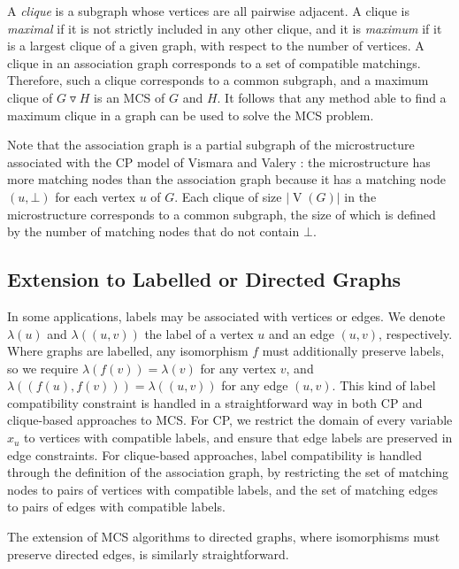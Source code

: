 \documentclass{llncs}
\newcommand{\modularproduct}{\operatorname{\triangledown}}
\begin{document}
A \emph{clique} is a subgraph whose vertices are all pairwise adjacent. A clique is \emph{maximal}
if it is not strictly included in any other clique, and it is \emph{maximum} if it is a largest
clique of a given graph, with respect to the number of vertices.  A clique in an association graph
corresponds to a set of compatible matchings. Therefore, such a clique corresponds to a common
subgraph, and a maximum clique of $G \modularproduct H$ is an MCS of $G$ and $H$.  It follows that
any method able to find a maximum clique in a graph can be used to solve the MCS problem.

Note that the association graph is a partial subgraph of the microstructure
\cite{DBLP:conf/aaai/Jegou93a} associated with the CP model of  Vismara and Valery
\cite{DBLP:conf/mco/VismaraV08}: the microstructure has more matching nodes than the association
graph because it has a matching node $(u,\bot)$ for each vertex $u$ of $G$. Each clique of size
$\left|\operatorname{V}(G)\right|$ in the microstructure corresponds to a common subgraph, the size
of which is defined by the number of matching nodes that do not contain $\bot$.

\subsection{Extension to Labelled or Directed Graphs}\label{extension}

In some applications, labels may be associated with vertices or edges. We denote $\lambda(u)$ and
$\lambda((u, v))$ the label of a vertex $u$ and an edge $(u, v)$, respectively. Where graphs are
labelled, any isomorphism $f$ must additionally preserve labels, so we require $\lambda(f(v)) =
\lambda(v)$ for any vertex $v$, and $\lambda((f(u), f(v))) = \lambda((u, v))$ for any edge $(u, v)$.
This kind of label compatibility constraint is handled in a straightforward way in both CP and
clique-based approaches to MCS.  For CP, we restrict the domain of every variable $x_u$ to vertices
with compatible labels, and ensure that edge labels are preserved in edge constraints.
For clique-based approaches, label compatibility is handled through the definition of the
association graph, by restricting the set of matching nodes to pairs of vertices with compatible
labels, and the set of matching edges to pairs of edges with compatible labels.

The extension of MCS algorithms to directed graphs, where isomorphisms must preserve directed edges,
is similarly straightforward.
\end{document}
